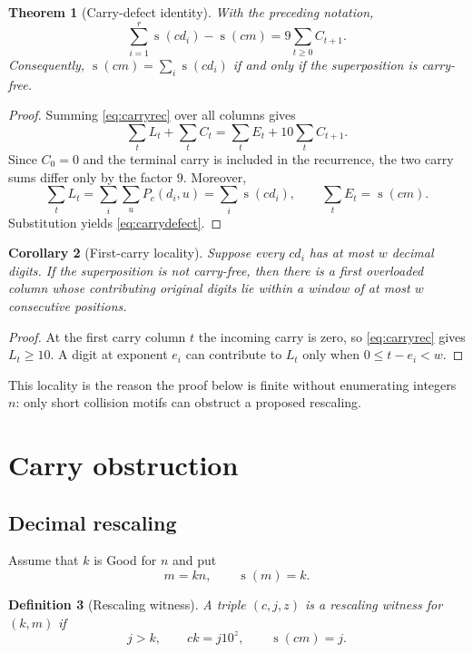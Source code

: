 \documentclass[11pt]{article}
\newtheorem{theorem}{Theorem}[section]
\newtheorem{corollary}[theorem]{Corollary}
\newtheorem{definition}[theorem]{Definition}
\newcommand{\ds}{\operatorname{s}}
\begin{document}
\begin{theorem}[Carry-defect identity]\label{thm:carrydefect}
With the preceding notation,
\begin{equation}\label{eq:carrydefect}
  \sum_{i=1}^r \ds(cd_i)-\ds(cm)
  =9\sum_{t\ge0} C_{t+1}.
\end{equation}
Consequently, $\ds(cm)=\sum_i\ds(cd_i)$ if and only if the superposition is carry-free.
\end{theorem}

\begin{proof}
Summing \eqref{eq:carryrec} over all columns gives
\[
 \sum_t L_t+\sum_t C_t=\sum_t E_t+10\sum_t C_{t+1}.
\]
Since $C_0=0$ and the terminal carry is included in the recurrence, the two carry sums differ only by the factor $9$.  Moreover,
\[
 \sum_t L_t=\sum_i\sum_u P_c(d_i,u)=\sum_i\ds(cd_i),
 \qquad \sum_t E_t=\ds(cm).
\]
Substitution yields \eqref{eq:carrydefect}.
\end{proof}

\begin{corollary}[First-carry locality]\label{cor:locality}
Suppose every $cd_i$ has at most $w$ decimal digits.  If the superposition is not carry-free, then there is a first overloaded column whose contributing original digits lie within a window of at most $w$ consecutive positions.
\end{corollary}

\begin{proof}
At the first carry column $t$ the incoming carry is zero, so \eqref{eq:carryrec} gives $L_t\ge10$.  A digit at exponent $e_i$ can contribute to $L_t$ only when $0\le t-e_i<w$.
\end{proof}

This locality is the reason the proof below is finite without enumerating integers $n$: only short collision motifs can obstruct a proposed rescaling.

\section{Carry obstruction}

\subsection{Decimal rescaling}
Assume that $k$ is Good for $n$ and put
\[
  m=kn,
  \qquad \ds(m)=k.
\]

\begin{definition}[Rescaling witness]
A triple $(c,j,z)$ is a rescaling witness for $(k,m)$ if
\begin{equation}\label{eq:rescale}
  j>k,\qquad ck=j10^z,\qquad \ds(cm)=j.
\end{equation}
\end{definition}
\end{document}
